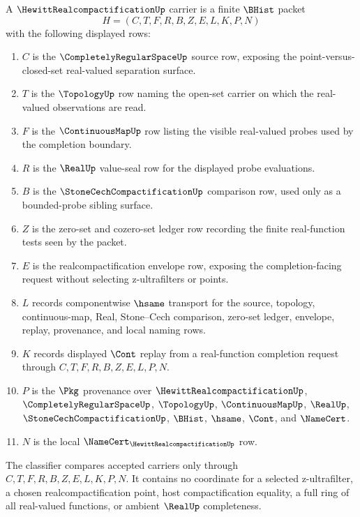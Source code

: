 \begin{definition}
\label{def:hewitt-realcompactification-carrier}
A $\HewittRealcompactificationUp$ carrier is a finite $\BHist$ packet
$$
H=(C,T,F,R,B,Z,E,L,K,P,N)
$$
with the following displayed rows:
\begin{enumerate}
\item $C$ is the $\CompletelyRegularSpaceUp$ source row, exposing the point-versus-closed-set real-valued separation surface.
\item $T$ is the $\TopologyUp$ row naming the open-set carrier on which the real-valued observations are read.
\item $F$ is the $\ContinuousMapUp$ row listing the visible real-valued probes used by the completion boundary.
\item $R$ is the $\RealUp$ value-seal row for the displayed probe evaluations.
\item $B$ is the $\StoneCechCompactificationUp$ comparison row, used only as a bounded-probe sibling surface.
\item $Z$ is the zero-set and cozero-set ledger row recording the finite real-function tests seen by the packet.
\item $E$ is the realcompactification envelope row, exposing the completion-facing request without selecting z-ultrafilters or points.
\item $L$ records componentwise $\hsame$ transport for the source, topology, continuous-map, Real, Stone--Cech comparison, zero-set ledger, envelope, replay, provenance, and local naming rows.
\item $K$ records displayed $\Cont$ replay from a real-function completion request through $C,T,F,R,B,Z,E,L,P,N$.
\item $P$ is the $\Pkg$ provenance over $\HewittRealcompactificationUp$, $\CompletelyRegularSpaceUp$, $\TopologyUp$, $\ContinuousMapUp$, $\RealUp$, $\StoneCechCompactificationUp$, $\BHist$, $\hsame$, $\Cont$, and $\NameCert$.
\item $N$ is the local $\NameCert_{\HewittRealcompactificationUp}$ row.
\end{enumerate}
The classifier compares accepted carriers only through $C,T,F,R,B,Z,E,L,K,P,N$. It contains no coordinate for a selected z-ultrafilter, a chosen realcompactification point, host compactification equality, a full ring of all real-valued functions, or ambient $\RealUp$ completeness.
\end{definition}

